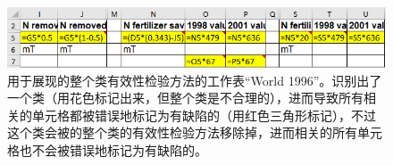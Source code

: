 \begin{figure}[tbp]
    \centering
    \includegraphics[width=\columnwidth]{figure/figure4.png}
    \caption{用于展现\wa 的整个类有效性检验方法的工作表``World 1996''。\cu 识别出了一个类（用花色标记出来，但整个类是不合理的），进而导致所有相关的单元格都被错误地标记为有缺陷的（用红色三角形标记），不过这个类会被\wa 的整个类的有效性检验方法移除掉，进而相关的所有单元格也不会被错误地标记为有缺陷的。}
    \label{figure4}
\end{figure}